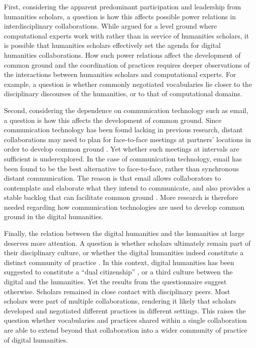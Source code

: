 \documentclass{article}
\begin{document}
First, considering the apparent predominant participation and leadership from humanities scholars, a question is how this affects possible power relations in interdisciplinary collaborations. 
While \citet{mccarty2012a} argued for a level ground where computational experts work with rather than in service of humanities scholars, it is possible that humanities scholars effectively set the agenda for digital humanities collaborations.
How such power relations affect the development of common ground and the coordination of practices requires deeper observations of the interactions between humanities scholars and computational experts.
For example, a question is whether commonly negotiated vocabularies lie closer to the disciplinary discourses of the humanities, or to that of computational domains.

Second, considering the dependence on communication technology such as email, a question is how this affects the development of common ground.
Since communication technology has been found lacking in previous research, distant collaborations may need to plan for face-to-face meetings at partners' locations in order to develop common ground \citep{siemens2013,sonderegger2009}.
Yet whether such meetings at intervals are sufficient is underexplored.
In the case of communication technology, email has been found to be the best alternative to face-to-face, rather than synchronous distant communication. 
The reason is that email allows collaborators to contemplate and elaborate what they intend to communicate, and also provides a stable backlog that can facilitate common ground \citep{sonderegger2009}. 
More research is therefore needed regarding how communication technologies are used to develop common ground in the digital humanities.

Finally, the relation between the digital humanities and the humanities at large deserves more attention.
A question is whether scholars ultimately remain part of their disciplinary culture, or whether the digital humanities indeed constitute a distinct community of practice \citep{siemens2013, siemens2016}.
In this context, digital humanities has been suggested to constitute a ``dual citizenship'' \citep{Svensson2012}, or a third culture \citep{Hunter2014} between the digital and the humanities.
Yet the results from the questionnaire suggest otherwise. 
Scholars remained in close contact with disciplinary peers. 
Most scholars were part of multiple collaborations, rendering it likely that scholars developed and negotiated different practices in different settings. This raises the question whether vocabularies and practices shared within a single collaboration are able to extend beyond that collaboration into a wider community of practice of digital humanities.
\end{document}
